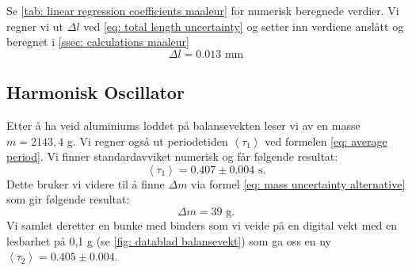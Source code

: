 \documentclass[reprint,norsk,notitlepage]{revtex4-2}
\begin{document}
Se \cref{tab: linear regression coefficients maaleur} for numerisk beregnede verdier. 
Vi regner vi ut $Δl$ ved \cref{eq: total length uncertainty} og setter inn verdiene anslått og beregnet i \cref{ssec: calculations maaleur}
\begin{equation}\label{eq: total length uncertainty results}
  Δl = 0.013 \text{ mm}
\end{equation}

\subsection{Harmonisk Oscillator}
Etter å ha veid aluminiums loddet på balansevekten leser vi av en masse $m = 2143,4$ g. Vi regner også ut periodetiden $\left<τ_1\right>$ ved formelen \cref{eq: average period}. Vi finner standardavviket numerisk og får følgende resultat: 
\begin{equation}\label{eq: period result}
  \left<τ_1\right> = 0.407 ± 0.004 \text{ s}.
\end{equation}
Dette bruker vi videre til å finne $Δm$ via formel \cref{eq: mass uncertainty alternative} som gir følgende resultat:
\begin{equation}\label{eq: mass uncertainty alternative result}
  Δm = 39 \text{ g}.
\end{equation}
Vi samlet deretter en bunke med binders som vi veide på en digital vekt med en lesbarhet på 0,1 g (se \cref{fig: datablad balansevekt}) som ga oss en ny $\left<τ_2\right> = 0.405 ± 0.004$. 
\end{document}

